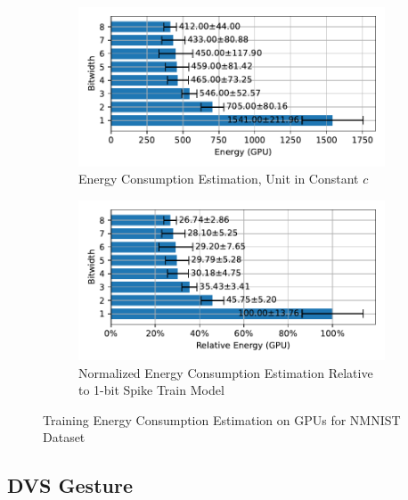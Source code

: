         \begin{figure}[H]
            \centering
            \begin{subfigure}[H]{0.6\textwidth}
                \includegraphics[width=\textwidth]{../standard/NMNIST/plots/nmnist_train_energy_gpu_horizontal.pdf}
                \caption{Energy Consumption Estimation, Unit in Constant $c$}
            \end{subfigure}
            \hfill
            \begin{subfigure}[H]{0.6\textwidth}
                \includegraphics[width=\textwidth]{../standard/NMNIST/plots/nmnist_train_relative_energy_gpu_horizontal.pdf}
                \caption{Normalized Energy Consumption Estimation Relative to 1-bit Spike Train Model}
            \end{subfigure}
            \caption{Training Energy Consumption Estimation on GPUs for NMNIST Dataset}
        \end{figure}

    \subsection{DVS Gesture}
    \label{appendix:energy_gpu_dvs_gesture}

